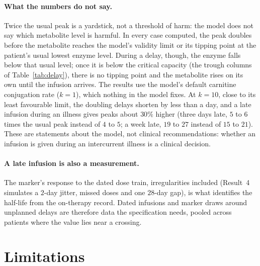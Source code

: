 \documentclass[11pt,a4paper]{article}
\begin{document}
\paragraph{What the numbers do not say.} Twice the usual peak is a yardstick, not a threshold of
harm: the model does not say which metabolite level is harmful. In every case computed, the peak
doubles before the metabolite reaches the model's validity limit or its tipping point at the
patient's usual lowest enzyme level. During a delay, though, the enzyme falls below that usual
level; once it is below the critical capacity (the trough columns of Table~\ref{tab:delay}),
there is no tipping point and the metabolite rises on its own until the infusion arrives. The
results use the model's default carnitine conjugation rate ($k=1$), which nothing in the model
fixes. At $k=10$, close to its least favourable limit, the doubling delays shorten by less than a
day, and a late infusion during an illness gives peaks about $30\%$ higher (three days late, $5$
to $6$ times the usual peak instead of $4$ to $5$; a week late, $19$ to $27$ instead of $15$ to
$21$). These are statements about the model, not clinical recommendations: whether an infusion
is given during an intercurrent illness is a clinical decision.

\paragraph{A late infusion is also a measurement.} The marker's response to the dated dose train,
irregularities included (Result~4 simulates a $2$-day jitter, missed doses and one $28$-day gap),
is what identifies the half-life from the on-therapy record. Dated infusions and marker draws
around unplanned delays are therefore data the specification needs, pooled across patients where
the value lies near a crossing.

\section{Limitations}
\end{document}
